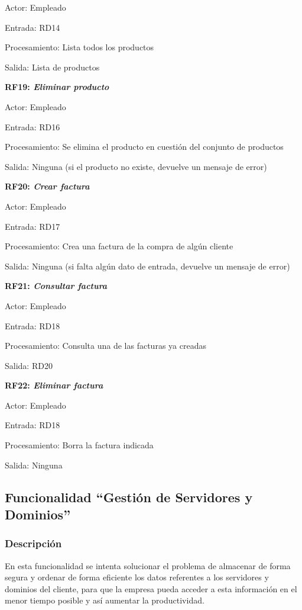 \documentclass[paper=a4, fontsize=11pt, spanish]{scrartcl}
\begin{document}
	Actor: Empleado

	Entrada: RD14

	Procesamiento: Lista todos los productos

	Salida: Lista de productos

	\setlength{\parindent}{0em}
	\textbf{RF19: \textit{Eliminar producto}}
	\setlength{\parindent}{2em}

	Actor: Empleado

	Entrada: RD16

	Procesamiento: Se elimina el producto en cuestión del conjunto de productos

	Salida: Ninguna (si el producto no existe, devuelve un mensaje de error)

	\setlength{\parindent}{0em}
	\textbf{RF20: \textit{Crear factura}}
	\setlength{\parindent}{2em}

	Actor: Empleado

	Entrada: RD17

	Procesamiento: Crea una factura de la compra de algún cliente

	Salida: Ninguna (si falta algún dato de entrada, devuelve un mensaje de error)

	\setlength{\parindent}{0em}
	\textbf{RF21: \textit{Consultar factura}}
	\setlength{\parindent}{2em}

	Actor: Empleado

	Entrada: RD18

	Procesamiento: Consulta una de las facturas ya creadas

	Salida: RD20

	\setlength{\parindent}{0em}
	\textbf{RF22: \textit{Eliminar factura}}
	\setlength{\parindent}{2em}

	Actor: Empleado

	Entrada: RD18

	Procesamiento: Borra la factura indicada

	Salida: Ninguna


\subsection{Funcionalidad “Gestión de Servidores y Dominios”}

\subsubsection{Descripción}
\setlength{\parindent}{3em} En esta funcionalidad se intenta solucionar el problema de almacenar de forma segura y ordenar de forma eficiente los datos referentes a los servidores y dominios del cliente, para que la empresa pueda acceder a esta información en el menor tiempo posible y así aumentar la productividad.
\end{document}
